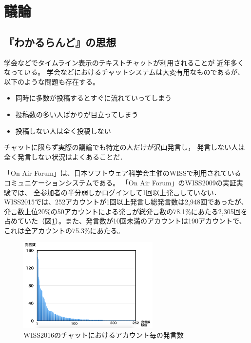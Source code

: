 \section{議論}

\subsection{『わかるらんど』の思想}

学会などでタイムライン表示のテキストチャットが利用されることが
近年多くなっている\cite{WISSのチャットの報告論文}。
学会などにおけるチャットシステムは大変有用なものであるが、
以下のような問題も存在する。

\begin{itemize}
\item 同時に多数が投稿するとすぐに流れていってしまう
\item 投稿数の多い人ばかりが目立ってしまう
\item 投稿しない人は全く投稿しない
\end{itemize}

チャットに限らず実際の議論でも特定の人だけが沢山発言し，
発言しない人は全く発言しない状況はよくあることだ．

「On Air Forum」は、日本ソフトウェア科学会主催のWISSで利用されている
コミュニケーションシステムである。
「On Air Forum」のWISS2009の実証実験\cite{nishida2011}では、
全参加者の半分弱しかログインして1回以上発言していない．
WISS2015では、252アカウントが1回以上発言し総発言数は2,948回であったが、発言数上位20\%の50アカウントによる発言が総発言数の78.1\%にあたる2,305回を占めていた（図\ref{wisschat}）。また、発言数が10回未満のアカウントは190アカウントで、これは全アカウントの75.3\%にあたる。

\begin{figure}[h]
\centering
\includegraphics[width=7cm]{images/wisschat.png}
\caption{WISS2016のチャットにおけるアカウント毎の発言数}
\label{wisschat}
\end{figure}

